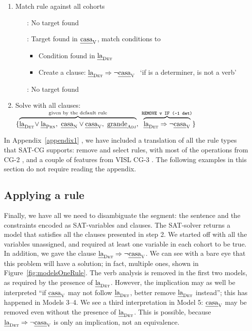 \begin{enumerate}
\item Match rule against all cohorts
 \begin{itemize}
    \item[\la:] No target found
    \item[\casa:] Target found in $\text{\em casa}_{\text{\sc V}}$, match conditions to \la
      \begin{itemize}
       \item Condition found in $\text{\em la}_{\text{\sc Det}}$
       \item Create a clause: $\text{\em la}_{\text{\sc Det}} \Rightarrow \neg \text{\em casa}_{\text{\sc V}} \ $ `if \la{} is a determiner, \casa{} is not a verb'
      \end{itemize}
    \item[\grande:] No target found
  \end{itemize}
\item Solve with all clauses: 
  $\{ \ob{\laDet \! \vee \laPrn, \ \casaN \vee \casaV, \  \grandeAdj}^{\text{given by the default rule}}, \ 
      \ob{\laDet \Rightarrow \neg \casaV}^{\t{REMOVE v IF (-1 det)}} \}$
\end{enumerate}

In Appendix~\ref{appendix1}
, we have included a translation of all the rule types that SAT-CG supports: 
{\sc remove} and {\sc select} rules, with most of the operations from CG-2 \cite{tapanainen1996}, and a couple of features from VISL CG-3 \cite{vislcg3}.
The following examples in this section do not require reading the appendix.

\subsection{Applying a rule}


Finally, we have all we need to disambiguate the segment: the sentence and the constraints encoded as SAT-variables and clauses. The SAT-solver returns a model that satisfies all the clauses presented in step 2.
We started off with all the variables unassigned, and required at least one variable 
in each cohort to be true. In addition, we gave the clause $\text{\em la}_{\text{\sc Det}} \Rightarrow \neg \text{\em casa}_{\text{\sc V}}$.
We can see with a bare eye that this problem will have a solution; in fact, multiple ones, 
shown in Figure~\ref{fig:modelsOneRule}.
The verb analysis is removed in the first two models, as required by the presence of $\text{\em la}_{\text{\sc Det}}$. However, the implication may as well be interpreted ``if $\text{\em casa}_{\text{\sc V}}$ may not follow $\text{\em la}_{\text{\sc Det}}$, better remove $\text{\em la}_{\text{\sc Det}}$ instead''; this has happened in Models 3--4. 
We see a third interpretation in Model 5: $\text{\em casa}_{\text{\sc V}}$ may be removed even without 
the presence of $\text{\em la}_{\text{\sc Det}}$. This is possible, because $\text{\em la}_{\text{\sc Det}} \Rightarrow \neg \text{\em casa}_{\text{\sc V}}$ is only an implication, not an equivalence.

